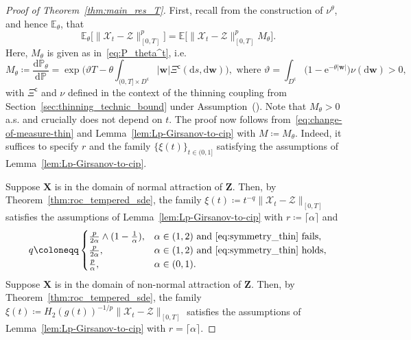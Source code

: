 \documentclass[en,oneside,bbfont,article]{amsart}
\theoremstyle{remark}
\theoremstyle{definition}
\theoremstyle{definition}
\newcommand\X{\bm{\mathcal{X}}}
\newcommand\ZZ{\bm{\mathcal{Z}}}
\newcommand\E{\mathds{E}}
\newcommand\e{\mathord{\mathrm{e}}}
\newcommand\p{\mathds{P}}
\newcommand\1{\mathds{1}}
\newcommand\co{\mathsf{c}}
\newcommand{\D}{\mathrm{d}}
\begin{document}
\begin{proof}[Proof of Theorem~\ref{thm:main_res_T}]
First, recall from the construction of $\nu^\theta$, and hence $\E_\theta$, that
\begin{equation}
\label{eq:change-of-measure-thin}
\E_\theta\big[\|\X_t-\ZZ\|_{[0,T]}^p\big] 
= \E\big[\|\X_t-\ZZ\|_{[0,T]}^p M_\theta \big].
\end{equation} 
Here, $M_\theta$ is given as in~\eqref{eq:P_theta^t}, i.e.
\begin{equation}\label{eq:M_theta_thinning}   
M_\theta 
\coloneqq \frac{\D\p_\theta}{\D\p}
=\exp\bigg(\vartheta T-\theta\int_{(0,T]\times D^\co}|\bm{w}|\Xi^\co(\D s,\D\bm{w})\bigg), 
\text{ where }
\vartheta
= \int_{D^\co}\big(1-\e^{-\theta|\bm{w}|}\big)\nu(\D\bm{w})>0,
\end{equation} 
with $\Xi^\co$ and $\nu$ defined in the context of the thinning coupling from Section~\ref{sec:thinning_technic_bound} under Assumption~(). Note that $M_\theta>0$ a.s. and crucially does not depend on $t$. The proof now follows from~\eqref{eq:change-of-measure-thin} and Lemma~\ref{lem:Lp-Girsanov-to-cip} with $M\coloneqq M_\theta$. Indeed, it suffices to specify $r$ and the family $\{\xi(t)\}_{t\in(0,1]}$ satisfying the assumptions of Lemma~\ref{lem:Lp-Girsanov-to-cip}.

Suppose $\bm{X}$ is in the domain of normal attraction of $\bm{Z}$. Then, by Theorem~\ref{thm:roc_tempered_sde}, the family $\xi(t)\coloneqq t^{-q}\|\X_t-\ZZ\|_{[0,T]}$ satisfies the assumptions of Lemma~\ref{lem:Lp-Girsanov-to-cip} with $r\coloneqq\lceil\alpha\rceil$ and 
\[
q
\coloneqq 
\begin{cases}
\frac{p}{2\alpha}\wedge (1-\frac{1}{\alpha}),&\alpha\in(1,2)\text{ and \eqref{eq:symmetry_thin} fails},\\
\frac{p}{2\alpha},&\alpha\in(1,2)\text{ and \eqref{eq:symmetry_thin} holds},\\
\frac{p}{\alpha},&\alpha\in(0,1).
\end{cases}
\]
Suppose $\bm{X}$ is in the domain of non-normal attraction of $\bm{Z}$. Then, by Theorem~\ref{thm:roc_tempered_sde}, the family $\xi(t) \coloneqq H_2(g(t))^{-1/p}\|\X_t-\ZZ\|_{[0,T]}$ satisfies the assumptions of Lemma~\ref{lem:Lp-Girsanov-to-cip} with $r=\lceil\alpha\rceil$.
\end{proof}
\end{document}

